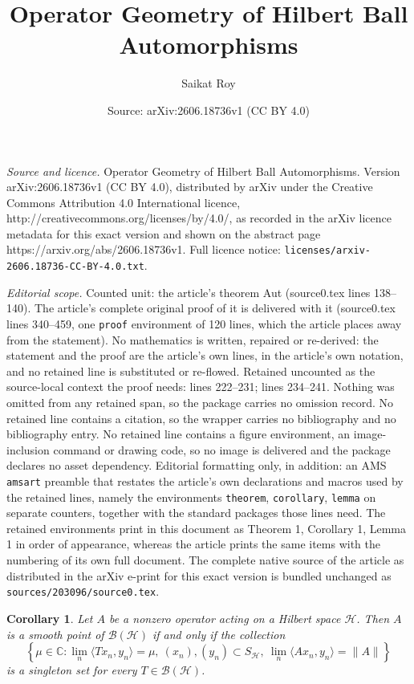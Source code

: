 \documentclass[10pt,a4paper]{amsart}
\title{Operator Geometry of Hilbert Ball Automorphisms}
\author{Saikat Roy}
\date{Source: arXiv:2606.18736v1 (CC BY 4.0)}
\newtheorem{corollary}{Corollary}
\renewcommand{\H}{\mathcal{H}}
\begin{document}
\maketitle

\noindent\emph{Source and licence.} Operator Geometry of Hilbert Ball Automorphisms. Version arXiv:2606.18736v1 (CC BY 4.0), distributed by arXiv under the Creative Commons Attribution 4.0 International licence, http://creativecommons.org/licenses/by/4.0/, as recorded in the arXiv licence metadata for this exact version and shown on the abstract page https://arxiv.org/abs/2606.18736v1. Full licence notice: \texttt{licenses/arxiv-2606.18736-CC-BY-4.0.txt}.\par\smallskip

\noindent\textit{Editorial scope.} Counted unit: the article's theorem Aut (source0.tex lines 138--140). The article's complete original proof of it is delivered with it (source0.tex lines 340--459, one \texttt{proof} environment of 120 lines, which the article places away from the statement). No mathematics is written, repaired or re-derived: the statement and the proof are the article's own lines, in the article's own notation, and no retained line is substituted or re-flowed.  Retained uncounted as the source-local context the proof needs: lines 222--231; lines 234--241.  Nothing was omitted from any retained span, so the package carries no omission record.  No retained line contains a citation, so the wrapper carries no bibliography and no bibliography entry.  No retained line contains a figure environment, an image-inclusion command or drawing code, so no image is delivered and the package declares no asset dependency.  Editorial formatting only, in addition: an AMS \texttt{amsart} preamble that restates the article's own declarations and macros used by the retained lines, namely the environments \texttt{theorem}, \texttt{corollary}, \texttt{lemma} on separate counters, together with the standard packages those lines need.  The retained environments print in this document as Theorem 1, Corollary 1, Lemma 1 in order of appearance, whereas the article prints the same items with the numbering of its own full document.  The complete native source of the article as distributed in the arXiv e-print for this exact version is bundled unchanged as \texttt{sources/203096/source0.tex}.
\begin{corollary}\label{smoothness-Hilbert}
Let $A$ be a nonzero operator acting on a Hilbert space $\H$. Then $A$ is a smooth point of 
$\mathcal{B}(\mathcal{H})$ if and only if the collection
\[
\left\{\mu \in \mathbb{C} : \lim_n \langle Tx_n, y_n \rangle 
= \mu,\ (x_n), (y_n) \subset S_{\mathcal{H}},\ 
\lim_n \langle Ax_n, y_n \rangle = \|A\|\right\}
\]
is a singleton set for every $T \in \mathcal{B}(\mathcal{H})$.
\end{corollary}
\end{document}
